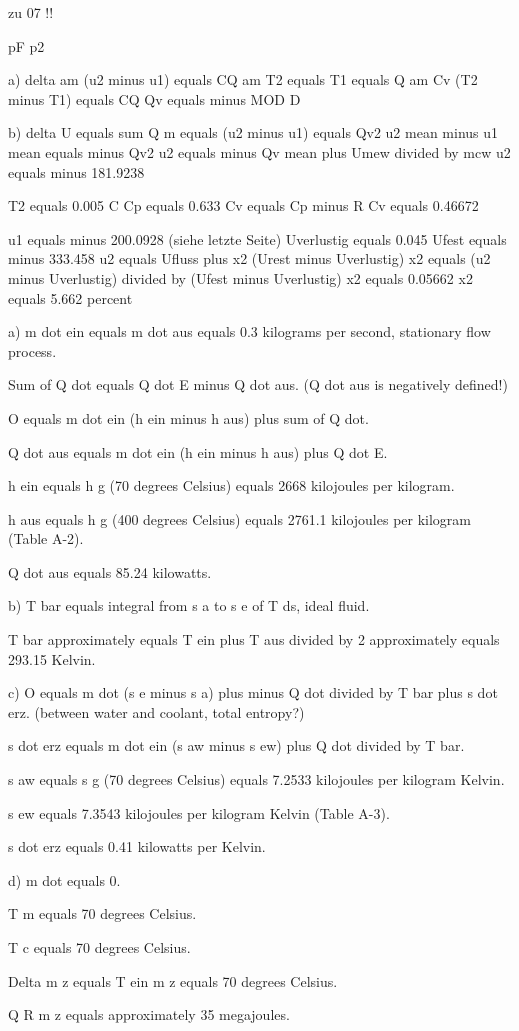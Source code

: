 zu 07 !! 

pF p2 

a) delta am (u2 minus u1) equals CQ 
am T2 equals T1 equals Q 
am Cv (T2 minus T1) equals CQ 
Qv equals minus MOD D 

b) delta U equals sum Q 
m equals (u2 minus u1) equals Qv2 
u2 mean minus u1 mean equals minus Qv2 
u2 equals minus Qv mean plus Umew divided by mcw 
u2 equals minus 181.9238 

T2 equals 0.005 C 
Cp equals 0.633 
Cv equals Cp minus R 
Cv equals 0.46672 

u1 equals minus 200.0928 (siehe letzte Seite) 
Uverlustig equals 0.045 
Ufest equals minus 333.458 
u2 equals Ufluss plus x2 (Urest minus Uverlustig) 
x2 equals (u2 minus Uverlustig) divided by (Ufest minus Uverlustig) 
x2 equals 0.05662 
x2 equals 5.662 percent

a) m dot ein equals m dot aus equals 0.3 kilograms per second, stationary flow process.

Sum of Q dot equals Q dot E minus Q dot aus. (Q dot aus is negatively defined!)

O equals m dot ein (h ein minus h aus) plus sum of Q dot.

Q dot aus equals m dot ein (h ein minus h aus) plus Q dot E.

h ein equals h g (70 degrees Celsius) equals 2668 kilojoules per kilogram.

h aus equals h g (400 degrees Celsius) equals 2761.1 kilojoules per kilogram (Table A-2).

Q dot aus equals 85.24 kilowatts.

b) T bar equals integral from s a to s e of T ds, ideal fluid.

T bar approximately equals T ein plus T aus divided by 2 approximately equals 293.15 Kelvin.

c) O equals m dot (s e minus s a) plus minus Q dot divided by T bar plus s dot erz. (between water and coolant, total entropy?)

s dot erz equals m dot ein (s aw minus s ew) plus Q dot divided by T bar.

s aw equals s g (70 degrees Celsius) equals 7.2533 kilojoules per kilogram Kelvin.

s ew equals 7.3543 kilojoules per kilogram Kelvin (Table A-3).

s dot erz equals 0.41 kilowatts per Kelvin.

d) m dot equals 0.

T m equals 70 degrees Celsius.

T c equals 70 degrees Celsius.

Delta m z equals T ein m z equals 70 degrees Celsius.

Q R m z equals approximately 35 megajoules.